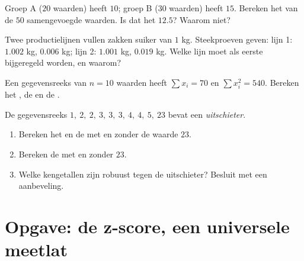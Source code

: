 \begin{exercise}[$\star\star$]\label{exo:g11:stat:7}
Groep A ($20$ waarden) heeft  $10$; groep B ($30$ waarden) heeft
 $15$. Bereken het  van de $50$ samengevoegde waarden. Is
dat het  $12.5$? Waarom niet?
\end{exercise}

\begin{exercise}[$\star\star$]\label{exo:g11:stat:8}
Twee productielijnen vullen zakken suiker van $1$ kg. Steekproeven geven:
lijn 1:  $1.002$ kg,  $0.006$ kg; lijn 2:
 $1.001$ kg,  $0.019$ kg. Welke lijn moet als
eerste bijgeregeld worden, en waarom?
\end{exercise}

\begin{exercise}[$\star\star$]\label{exo:g11:stat:9}
Een gegevensreeks van $n = 10$ waarden heeft $\sum x_i = 70$ en
$\sum x_i^2 = 540$. Bereken het , de  en de
.
\end{exercise}

\begin{exercise}[$\star\star\star$]\label{exo:g11:stat:10}
De gegevensreeks $1,\ 2,\ 2,\ 3,\ 3,\ 3,\ 4,\ 4,\ 5,\ 23$ bevat een
\emph{uitschieter}.
\begin{enumerate}
  \item Bereken het  en de  met en zonder de waarde $23$.
  \item Bereken de  met en zonder $23$.
  \item Welke kengetallen zijn robuust tegen de uitschieter? Besluit met een
        aanbeveling.
\end{enumerate}
\end{exercise}

\section{Opgave: de z-score, een universele meetlat}

